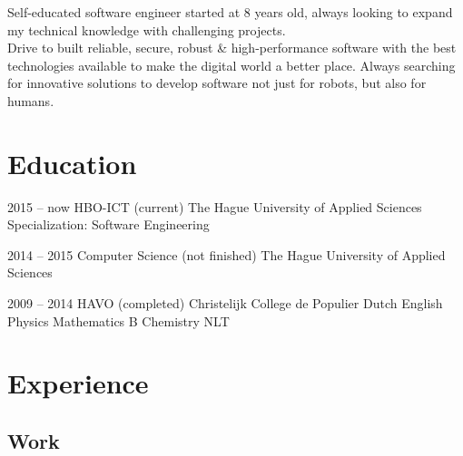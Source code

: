 \documentclass[]{friggeri-cv}
\begin{document}
Self-educated software engineer started at 8 years old, always looking to expand
my technical knowledge with challenging projects.\\
Drive to built reliable, secure, robust \& high-performance software with the
best technologies available to make the digital world a better place.
Always searching for innovative solutions to develop software not just for
robots, but also for humans.


\section{Education}

\begin{entrylist}

\entry
{2015 -- now}
{HBO-ICT {\normalfont (current)}}
{The Hague University of Applied Sciences}
{Specialization: Software Engineering}

\entry
{2014 -- 2015}
{Computer Science {\normalfont (not finished)}}
{The Hague University of Applied Sciences}

\entry
{2009 -- 2014}
{HAVO {\normalfont (completed)}}
{Christelijk College de Populier}
{Dutch \textperiodcentered{} English \textperiodcentered{} Physics \textperiodcentered{} Mathematics B \textperiodcentered{} Chemistry \textperiodcentered{} NLT}

\end{entrylist}


\section{Experience}

\subsection{Work}
\end{document}

